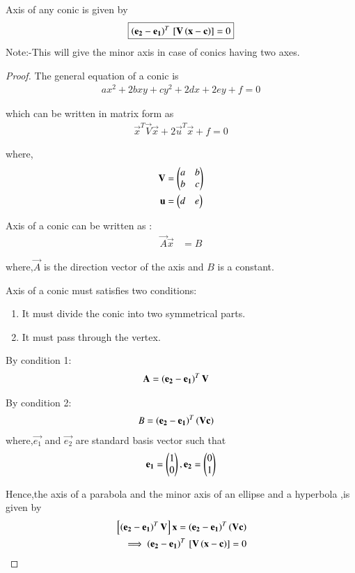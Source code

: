 \documentclass[journal,12pt,twocolumn]{IEEEtran}
\begin{document}
\begin{lemma}
Axis of any conic is given by
\begin{align}
    \boxed{\left(\mathbf{e_2}-\mathbf{e_1}\right)^T{}\left[\mathbf{V}\left(\mathbf{x}-\mathbf{c}\right)\right] = 0}
\end{align}
Note:-This will give the minor axis in case of conics having two axes.
\end{lemma}
\begin{proof}
The general equation of a conic is
\begin{align}
  ax^2+2bxy+cy^2+2dx+2ey+f=0
\end{align}

which can be written in matrix form as
\begin{align}
    \vec{x}^T\vec{V}\vec{x} + 2\vec{u}^T\vec{x} + f =0
\end{align}

where,
\begin{align}
    \mathbf{V} &=\begin{pmatrix}a & b \\ b& c\end{pmatrix}
    \\
    \mathbf{u} &= \begin{pmatrix}d & e\end{pmatrix}
\end{align}

Axis of a conic can be written as :
\begin{align}
    \vec{A}\vec{x} &= B
\end{align}

where,$\vec{A}$ is the direction vector of the axis and $B$ is a constant.

Axis of a conic must satisfies two conditions:
\begin{enumerate}
    \item  It must divide the conic into two symmetrical parts. 
    \item  It must pass through the vertex.
\end{enumerate}

By condition 1:
\begin{align}
    \mathbf{A} &= \left(\mathbf{e_2}-\mathbf{e_1}\right)^T\mathbf{V}
\end{align}

By condition 2:
\begin{align}
    B &= \left(\mathbf{e_2}-\mathbf{e_1}\right)^T\left(\mathbf{V}\mathbf{c}\right)
\end{align}
where,$\vec{e_1}$ and $\vec{e_2}$ are standard basis vector such that
\begin{align}
    \mathbf{e_1}=\begin{pmatrix}1 \\0\end{pmatrix},\mathbf{e_2}=\begin{pmatrix}0 \\ 1\end{pmatrix}
\end{align}

Hence,the axis of a parabola and the minor axis of an ellipse and a hyperbola ,is given by
\begin{align}
    {}\left[\left(\mathbf{e_2}-\mathbf{e_1}\right)^T\mathbf{V}\right]\mathbf{x} = \left(\mathbf{e_2}-\mathbf{e_1}\right)^T\left(\mathbf{V}\mathbf{c}\right)
    \\
    \implies \left(\mathbf{e_2}-\mathbf{e_1}\right)^T{}\left[\mathbf{V}\left(\mathbf{x}-\mathbf{c}\right)\right] = 0
\end{align}
\end{proof}
\end{document}
